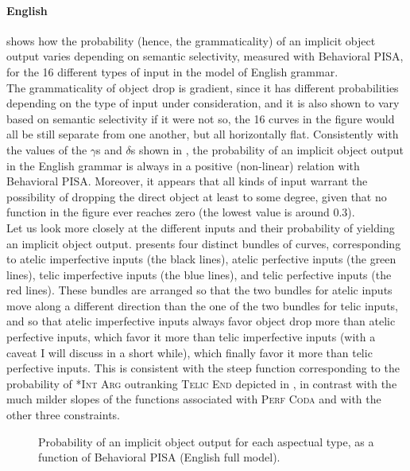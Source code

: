 \paragraph{English} 
 shows how the probability (hence, the grammaticality) of an implicit object output varies depending on semantic selectivity, measured with Behavioral PISA, for the 16 different types of input in the model of English grammar.\\
The grammaticality of object drop is gradient, since it has different probabilities depending on the type of input under consideration, and it is also shown to vary based on semantic selectivity \textemdash if it were not so, the 16 curves in the figure would all be still separate from one another, but all horizontally flat. Consistently with the values of the $\gamma$s and $\delta$s shown in , the probability of an implicit object output in the English grammar is always in a positive (non-linear) relation with Behavioral PISA. Moreover, it appears that all kinds of input warrant the possibility of dropping the direct object at least to some degree, given that no function in the figure ever reaches zero (the lowest value is around 0.3).\\
Let us look more closely at the different inputs and their probability of yielding an implicit object output.  presents four distinct bundles of curves, corresponding to atelic imperfective inputs (the black lines), atelic perfective inputs (the green lines), telic imperfective inputs (the blue lines), and telic perfective inputs (the red lines). These bundles are arranged so that the two bundles for atelic inputs move along a different direction than the one of the two bundles for telic inputs, and so that atelic imperfective inputs always favor object drop more than atelic perfective inputs, which favor it more than telic imperfective inputs (with a caveat I will discuss in a short while), which finally favor it more than telic perfective inputs. This is consistent with the steep function corresponding to the probability of \textsc{*Int Arg} outranking \textsc{Telic End} depicted in , in contrast with the much milder slopes of the functions associated with \textsc{Perf Coda} and with the other three constraints.

\begin{figure}[htb]
\vspace*{3mm}
\caption{Probability of an implicit object output for each aspectual type, as a function of Behavioral PISA (English full model).}
    
\end{figure}

